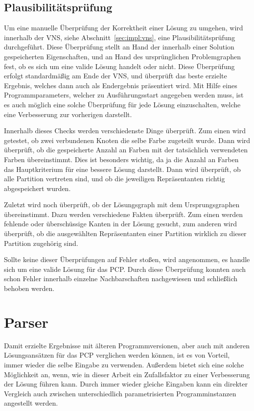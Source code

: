 \subsection{Plausibilitätsprüfung}
\label{sec:plausibility}
Um eine manuelle Überprüfung der Korrektheit einer Lösung zu umgehen, wird innerhalb der VNS, siehe Abschnitt~\ref{sec:impl:vns}, eine Plausibilitätsprüfung durchgeführt. Diese Überprüfung stellt an Hand 
der innerhalb einer Solution gespeicherten Eigenschaften, und an Hand des ursprünglichen Problemgraphen fest, ob es sich um eine valide Lösung handelt oder nicht. Diese Überprüfung erfolgt standardmäßig
am Ende der VNS, und überprüft das beste erzielte Ergebnis, welches dann auch als Endergebnis präsentiert wird. Mit Hilfe eines Programmparameters, welcher zu Ausführungsstart angegeben werden muss, ist es
auch möglich eine solche Überprüfung für jede Lösung einzuschalten, welche eine Verbesserung zur vorherigen darstellt. 

Innerhalb dieses Checks werden verschiedenste Dinge überprüft. Zum einen wird getestet, ob zwei verbundenen Knoten die selbe Farbe zugeteilt wurde. Dann wird überprüft, ob die gespeicherte Anzahl an Farben
mit der tatsächlich verwendeten Farben übereinstimmt. Dies ist besonders wichtig, da ja die Anzahl an Farben das Hauptkriterium für eine bessere Lösung darstellt. Dann wird überprüft, ob alle Partition
vertreten sind, und ob die jeweiligen Repräsentanten richtig abgespeichert wurden. 

Zuletzt wird noch überprüft, ob der Lösungsgraph mit dem Ursprungsgraphen übereinstimmt. Dazu werden verschiedene Fakten überprüft. Zum einen werden fehlende oder überschüssige Kanten in der Lösung gesucht, 
zum anderen wird überprüft, ob die ausgewählten Repräsentanten einer Partition wirklich zu dieser Partition zugehörig sind. 

Sollte keine dieser Überprüfungen auf Fehler stoßen, wird angenommen, es handle sich um eine valide Lösung für das PCP. Durch diese Überprüfung konnten auch schon Fehler innerhalb einzelne Nachbarschaften 
nachgewiesen und schließlich behoben werden.


\section{Parser}
\label{sec:parser}

Damit erzielte Ergebnisse mit älteren Programmversionen, aber auch mit anderen Lösungs\-ansätzen für das PCP verglichen werden können, ist es von
Vorteil, immer wieder die selbe Eingabe zu verwenden. Außerdem bietet sich eine solche Möglichkeit an, wenn, wie in dieser Arbeit ein Zufallsfaktor
zu einer Verbesserung der Lösung führen kann. Durch immer wieder gleiche Eingaben kann ein direkter Vergleich auch zwischen unterschiedlich
parametrisierten Programminstanzen angestellt werden.

